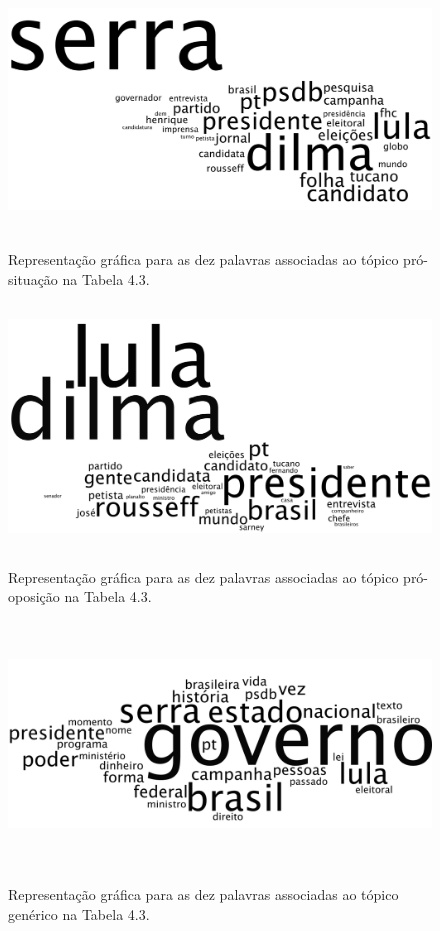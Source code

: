 \begin{figure}[h]
  \centering %
  \includegraphics[width=12.5cm, height=6.5cm]{situacao.png}\\
  \caption{Representação gráfica para as dez palavras associadas ao tópico pró-situação na Tabela 4.3.}
  \label{situacao}
\end{figure}

\begin{figure}[h]
  \centering %
  \includegraphics[width=12.5cm, height=6.5cm]{oposicao.png}\\
  \caption{Representação gráfica para as dez palavras associadas ao tópico pró-oposição na Tabela 4.3.}
  \label{oposicao}
\end{figure}



\begin{figure}[h]
  \centering %
  \includegraphics[width=12.5cm, height=6.5cm]{generico.png}\\
  \caption{Representação gráfica para as dez palavras associadas ao tópico genérico na Tabela 4.3.}
  \label{generico}
\end{figure}


